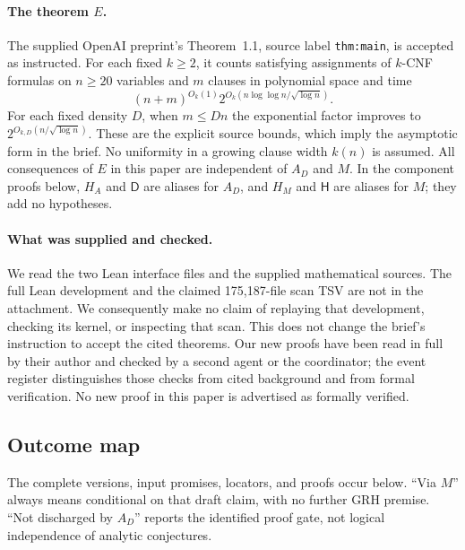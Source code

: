 \documentclass[11pt,a4paper]{article}
\begin{document}
\paragraph{The theorem $E$.}
The supplied OpenAI preprint's Theorem~1.1, source label
\texttt{thm:main}, is accepted as instructed.  For each fixed $k\geq2$, it
counts satisfying assignments of $k$-CNF formulas on $n\geq20$ variables and
$m$ clauses in polynomial space and time
\[
 (n+m)^{O_k(1)}
 2^{O_k(n\log\log n/\sqrt{\log n})}.
\]
For each fixed density $D$, when $m\leq Dn$ the exponential factor improves
to $2^{O_{k,D}(n/\sqrt{\log n})}$.  These are the explicit source bounds,
which imply the asymptotic form in the brief.  No uniformity in a growing
clause width $k(n)$ is assumed.  All consequences of $E$ in this paper are
independent of $A_D$ and $M$.  In the component proofs below,
$H_A$ and $\mathsf D$ are aliases for $A_D$, and $H_M$ and
$\mathsf H$ are aliases for $M$; they add no hypotheses.

\paragraph{What was supplied and checked.}
We read the two Lean interface files and the supplied mathematical sources.
The full Lean development and the claimed 175,187-file scan TSV are not in
the attachment.  We consequently make no claim of replaying that development,
checking its kernel, or inspecting that scan.  This does not change the
brief's instruction to accept the cited theorems.  Our new proofs have been
read in full by their author and checked by a second agent or the coordinator;
the event register distinguishes those checks from cited background and
from formal verification.  No new proof in this paper is advertised as
formally verified.

\subsection{Outcome map}

The complete versions, input promises, locators, and proofs occur below.
``Via $M$'' always means conditional on that draft claim, with no further
GRH premise.  ``Not discharged by $A_D$'' reports the identified proof gate,
not logical independence of analytic conjectures.
\end{document}
